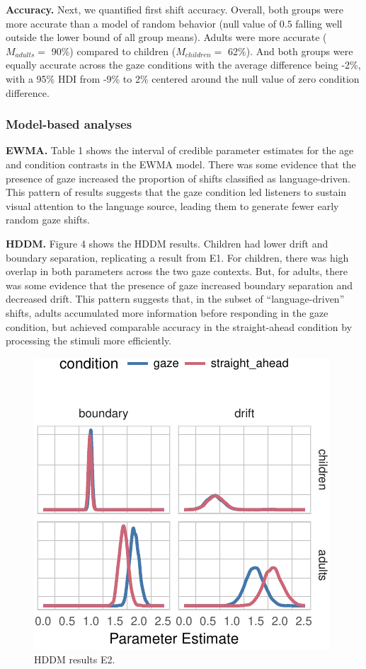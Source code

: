 \documentclass[10pt, letterpaper]{article}
\newenvironment{CodeChunk}{}{}
\begin{document}
\textbf{Accuracy.} Next, we quantified first shift accuracy. Overall,
both groups were more accurate than a model of random behavior (null
value of \(0.5\) falling well outside the lower bound of all group
means). Adults were more accurate (\(M_{adults} =\) 90\%) compared to
children (\(M_{children} =\) 62\%). And both groups were equally
accurate across the gaze conditions with the average difference being
-2\%, with a 95\% HDI from -9\% to 2\% centered around the null value of
zero condition difference.

\subsubsection{Model-based analyses}\label{model-based-analyses-1}

\textbf{EWMA.} Table 1 shows the interval of credible parameter
estimates for the age and condition contrasts in the EWMA model. There
was some evidence that the presence of gaze increased the proportion of
shifts classified as language-driven. This pattern of results suggests
that the gaze condition led listeners to sustain visual attention to the
language source, leading them to generate fewer early random gaze
shifts.

\textbf{HDDM.} Figure 4 shows the HDDM results. Children had lower drift
and boundary separation, replicating a result from E1. For children,
there was high overlap in both parameters across the two gaze contexts.
But, for adults, there was some evidence that the presence of gaze
increased boundary separation and decreased drift. This pattern suggests
that, in the subset of ``language-driven'' shifts, adults accumulated
more information before responding in the gaze condition, but achieved
comparable accuracy in the straight-ahead condition by processing the
stimuli more efficiently.

\begin{CodeChunk}
\begin{figure}[t]

{\centering \includegraphics[width=0.7\linewidth]{figs/hddm_plot_gaze-1} 

}

\caption[HDDM results E2]{HDDM results E2.}\label{fig:hddm_plot_gaze}
\end{figure}
\end{CodeChunk}
\end{document}

